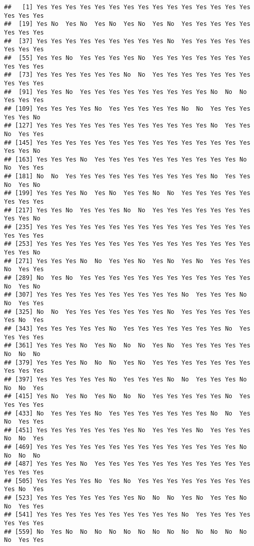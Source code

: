 \documentclass[
]{article}
\begin{document}
\begin{verbatim}
##   [1] Yes Yes Yes Yes Yes Yes Yes Yes Yes Yes Yes Yes Yes Yes Yes Yes Yes Yes
##  [19] Yes No  Yes No  Yes No  Yes No  Yes No  Yes Yes Yes Yes Yes Yes Yes Yes
##  [37] Yes Yes Yes Yes Yes Yes Yes Yes Yes No  Yes Yes Yes Yes Yes Yes Yes Yes
##  [55] Yes Yes No  Yes Yes Yes Yes No  Yes Yes Yes Yes Yes Yes Yes Yes Yes Yes
##  [73] Yes Yes Yes Yes Yes Yes No  No  Yes Yes Yes Yes Yes Yes Yes Yes Yes Yes
##  [91] Yes Yes No  Yes Yes Yes Yes Yes Yes Yes Yes Yes No  No  No  Yes Yes Yes
## [109] Yes Yes Yes Yes No  Yes Yes Yes Yes Yes No  No  Yes Yes Yes Yes Yes No 
## [127] Yes Yes Yes Yes Yes Yes Yes Yes Yes Yes Yes Yes No  Yes Yes No  Yes Yes
## [145] Yes Yes Yes Yes Yes Yes Yes Yes Yes Yes Yes Yes Yes Yes Yes Yes Yes No 
## [163] Yes Yes Yes No  Yes Yes Yes Yes Yes Yes Yes Yes Yes Yes No  No  Yes Yes
## [181] No  No  Yes Yes Yes Yes Yes Yes Yes Yes Yes Yes No  Yes Yes No  Yes No 
## [199] Yes Yes Yes No  Yes No  Yes Yes No  No  Yes Yes Yes Yes Yes Yes Yes Yes
## [217] Yes Yes No  Yes Yes Yes No  No  Yes Yes Yes Yes Yes Yes Yes Yes Yes No 
## [235] Yes Yes Yes Yes Yes Yes Yes Yes Yes Yes Yes Yes Yes Yes Yes Yes Yes Yes
## [253] Yes Yes Yes Yes Yes Yes Yes Yes Yes Yes Yes Yes Yes Yes Yes Yes Yes No 
## [271] Yes Yes Yes No  No  Yes Yes No  Yes No  Yes No  Yes Yes Yes No  Yes Yes
## [289] No  Yes No  Yes Yes Yes Yes Yes Yes Yes Yes Yes Yes Yes Yes No  Yes No 
## [307] Yes Yes Yes Yes Yes Yes Yes Yes Yes Yes No  Yes Yes Yes No  No  Yes Yes
## [325] No  No  Yes Yes Yes Yes Yes Yes Yes No  Yes Yes Yes Yes Yes Yes No  Yes
## [343] Yes Yes Yes Yes Yes No  Yes Yes Yes Yes Yes Yes Yes No  Yes Yes Yes Yes
## [361] Yes Yes Yes No  Yes No  No  No  Yes No  Yes Yes Yes Yes Yes No  No  No 
## [379] Yes Yes Yes No  No  No  Yes No  Yes Yes Yes Yes Yes Yes Yes Yes Yes Yes
## [397] Yes Yes Yes Yes Yes No  Yes Yes Yes No  No  Yes Yes Yes No  No  No  Yes
## [415] Yes No  Yes No  Yes No  No  No  Yes Yes Yes Yes Yes No  Yes Yes Yes Yes
## [433] No  Yes Yes Yes No  Yes Yes Yes Yes Yes Yes Yes No  No  Yes No  Yes Yes
## [451] Yes Yes Yes Yes Yes Yes Yes No  Yes Yes Yes No  Yes Yes Yes No  No  Yes
## [469] Yes Yes Yes Yes Yes Yes Yes Yes Yes Yes Yes Yes Yes Yes No  No  No  No 
## [487] Yes Yes Yes No  Yes Yes Yes Yes Yes Yes Yes Yes Yes Yes Yes Yes Yes Yes
## [505] Yes Yes Yes Yes No  Yes No  Yes Yes Yes Yes Yes Yes Yes Yes Yes No  Yes
## [523] Yes Yes Yes Yes Yes Yes Yes No  No  No  Yes No  Yes Yes No  No  Yes Yes
## [541] Yes Yes Yes Yes Yes Yes Yes Yes Yes Yes No  Yes Yes Yes Yes Yes Yes Yes
## [559] No  Yes No  No  No  No  No  No  No  No  No  No  No  No  No  No  Yes Yes

\end{verbatim}
\end{document}
